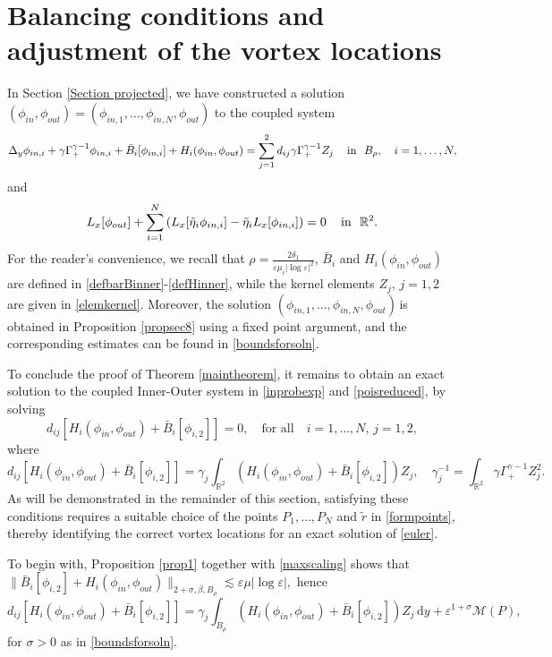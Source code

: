 \documentclass[11pt,reqno,a4paper]{amsart}
\numberwithin{equation}{section}
\def\dd{{\mathrm{d}}}
\newcommand{\R}{\mathbb{R}}
\newcommand{\inn}{{\quad\hbox{in } }}
\newcommand{\ve}{\varepsilon}
\begin{document}
\section{Balancing conditions and adjustment of the vortex locations}\label{reduced}
 In Section \ref{Section projected}, we have constructed a solution $(\phi_{in},\phi_{out})=(\phi_{in,1},\dots,\phi_{in,N},\phi_{out})$ to the coupled system 
\begin{equation*}
\Delta_y\phi_{in,i} +\gamma\Gamma^{\gamma-1}_{+}\phi_{in,i}+\bar{B}_i[\phi_{in,i}]+H_i(\phi_{in},\phi_{out})=\sum_{j=1}^{2}d_{ij}\gamma\Gamma^{\gamma-1}_{+}Z_j \, \inn \,\, B_{\rho}, \quad i=1,\dots,N,
\end{equation*}
and 
\[L_x[\phi_{out}]+\sum_{i=1}^{N} \left(L_x[\tilde{\eta}_i\phi_{in,i}]-\tilde{\eta}_iL_x[\phi_{in,i}]\right)=0 \, \inn \,\, \R^2.\]
For the reader's convenience, we recall that $\rho = \frac{2\delta_1}{\ve\mu_i|\log\ve|^2}$, $\bar{B}_i$ and $H_i(\phi_{in},\phi_{out})$ are defined in \eqref{defbarBinner}-\eqref{defHinner}, while the kernel elements $Z_j,\,j=1,2$ are given in \eqref{elemkernel}. Moreover, the solution  $(\phi_{in,1},\dots,\phi_{in,N},\phi_{out})$\,is obtained in Proposition \ref{propsec8} using a fixed point argument, and the corresponding estimates can be found in \eqref{boundsforsoln}.

To conclude the proof of Theorem \ref{maintheorem}, it remains to obtain an exact solution to the coupled Inner-Outer system in \eqref{inprobexp} and \eqref{poisreduced}, by solving   
\begin{equation}\label{zerofunctionals}
 d_{ij}\left[H_i(\phi_{in},\phi_{out})+\bar{B}_i[\phi_{i,2}]\right]=0, \quad \mbox{for all} \quad i=1,\dots,N, \, j=1,2,\end{equation}
where 
\begin{equation*}
        d_{ij}\left[H_i(\phi_{in},\phi_{out})+\bar{B}_i[\phi_{i,2}]\right]=\gamma_j \int_{\R^2}\left(H_i(\phi_{in},\phi_{out})+\bar B_i[\phi_{i,2}]\right)Z_j, \quad \gamma_{j}^{-1}=\int_{\R^2}\gamma\Gamma^{\gamma-1}_{+}Z_j^2.
        \end{equation*}
As will be demonstrated in the remainder of this section, satisfying these conditions requires a suitable choice of the points $P_1,\dots,P_N$ and $\tilde{r}$ in \eqref{formpoints}, thereby identifying the correct vortex locations for an exact solution of \eqref{euler}.

To begin with, Proposition \ref{prop1} together with \eqref{maxscaling} shows that $\|\bar{B}_i[\phi_{i,2}]+H_i(\phi_{in},\phi_{out})\|_{2+\sigma,\beta,B_{\rho}} \lesssim \ve\mu|\log\ve|,$ hence
\begin{equation*}
d_{ij}\left[H_i(\phi_{in},\phi_{out})+\bar{B}_i[\phi_{i,2}]\right]
=\gamma_{j}\int_{B_{\rho}} \left(H_i(\phi_{in},\phi_{out})+\bar{B}_i[\phi_{i,2}]\right)Z_{j}\,\dd y +\ve^{1+\sigma}\mathcal{M}(P),
\end{equation*}
for $\sigma>0$ as in \eqref{boundsforsoln}. 
\end{document}
